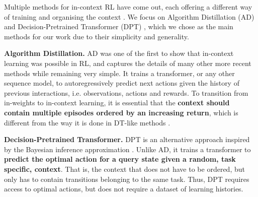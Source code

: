 \documentclass{article}
\begin{document}

Multiple methods for in-context RL have come out, each offering a different way of training and organising the context \citep{laskin2022context, lee2023supervised, mirchandani2023large, liu2023emergent, raparthy2023generalization, shi2024cross}. We focus on Algorithm Distillation (AD) \citep{laskin2022context} and Decision-Pretrained Transformer (DPT) \citep{lee2023supervised}, which we chose as the main methods for our work due to their simplicity and generality.

\textbf{Algorithm Distillation.} AD \citep{laskin2022context} was one of the first to show that in-context learning was possible in RL, and captures the details of many other more recent methods \citep{mirchandani2023large, liu2023emergent, shi2024cross} while remaining very simple. It trains a transformer, or any other sequence model, to autoregressively predict next actions given the history of previous interactions, i.e. observations, actions and rewards. To transition from in-weights to in-context learning, it is essential that the \textbf{context should contain multiple episodes ordered by an increasing return}, which is different from the way it is done in DT-like methods \citep{chen2021decision, janner2021offline, lee2022multi}. 


\textbf{Decision-Pretrained Transformer.} DPT is an alternative approach inspired by the Bayesian inference approximation \citep{muller2021transformers}. Unlike AD, it trains a transformer to \textbf{predict the optimal action for a query state given a random, task specific, context}. That is, the context that does not have to be ordered, but only has to contain transitions belonging to the same task. Thus, DPT requires access to optimal actions, but does not require a dataset of learning histories. 
\end{document}
